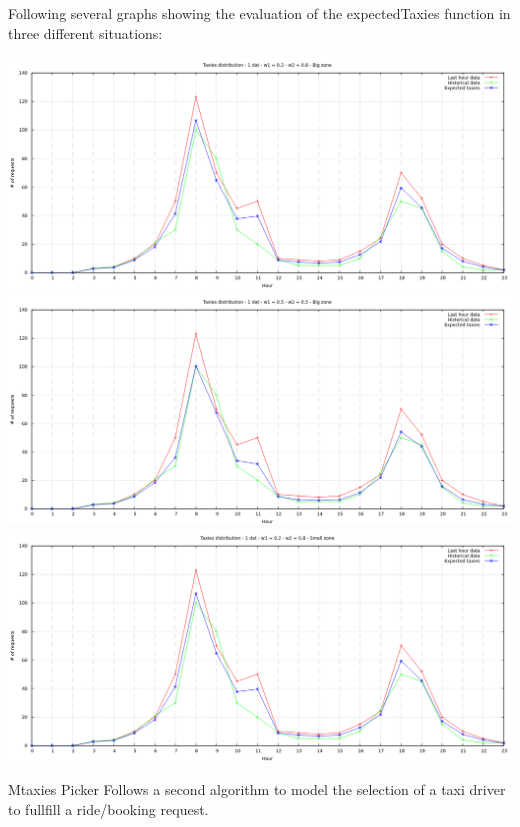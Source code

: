 \documentclass[11pt,titlepage]{article} %
\newenvironment{changemargin}[3]{%
\begin{list}{}{%
\setlength{\topsep}{0pt}%
\setlength{\headsep}{#3}%
\setlength{\leftmargin}{#1}%
\setlength{\rightmargin}{#2}%
\setlength{\listparindent}{\parindent}%
\setlength{\itemindent}{\parindent}%
\setlength{\parsep}{\parskip}%
}%
\item[]}{\end{list}}
\begin{document}
Following several graphs showing the evaluation of the expectedTaxies function in three different situations:\newline
\begin{changemargin}{-2cm}{0cm}{0cm}
	\includegraphics[scale=0.5]{graph1.png}
	\includegraphics[scale=0.5]{graph2.png}
	\includegraphics[scale=0.5]{graph3.png}
\end{changemargin}
\newpage
Mtaxies Picker
\noindent Follows a second algorithm to model the selection of a taxi driver to fullfill a ride/booking request.\newline
\end{document}
